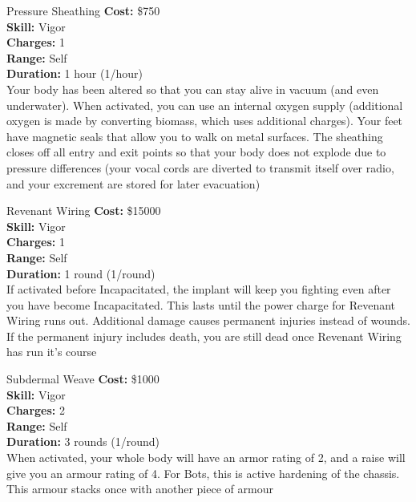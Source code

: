 \begin{multicols}{2}
\begin{genericsection}{Pressure Sheathing}
\textbf{Cost:} \$750\\
\textbf{Skill:} Vigor\\
\textbf{Charges:} 1\\
\textbf{Range:} Self\\
\textbf{Duration:} 1 hour (1/hour)\\
Your body has been altered so that you can stay alive in vacuum (and even underwater). When activated, you can use an internal oxygen supply (additional oxygen is made by converting biomass, which uses additional charges). Your feet have magnetic seals that allow you to walk on metal surfaces. The sheathing closes off all entry and exit points so that your body does not explode due to pressure differences (your vocal cords are diverted to transmit itself over radio, and your excrement are stored for later evacuation)
\end{genericsection}

\begin{genericsection}{Revenant Wiring}
\textbf{Cost:} \$15000\\
\textbf{Skill:} Vigor\\
\textbf{Charges:} 1\\
\textbf{Range:} Self\\
\textbf{Duration:} 1 round (1/round)\\
If activated before Incapacitated, the implant will keep you fighting even after you have become Incapacitated. This lasts until the power charge for Revenant Wiring runs out. Additional damage causes permanent injuries instead of wounds. If the permanent injury includes death, you are still dead once Revenant Wiring has run it's course
\end{genericsection}

\begin{genericsection}{Subdermal Weave}
\textbf{Cost:} \$1000\\
\textbf{Skill:} Vigor\\
\textbf{Charges:} 2\\
\textbf{Range:} Self\\
\textbf{Duration:} 3 rounds (1/round)\\
When activated, your whole body will have an armor rating of 2, and a raise will give you an armour rating of 4. For Bots, this is active hardening of the chassis. This armour stacks once with another piece of armour
\end{genericsection}


\end{multicols}
